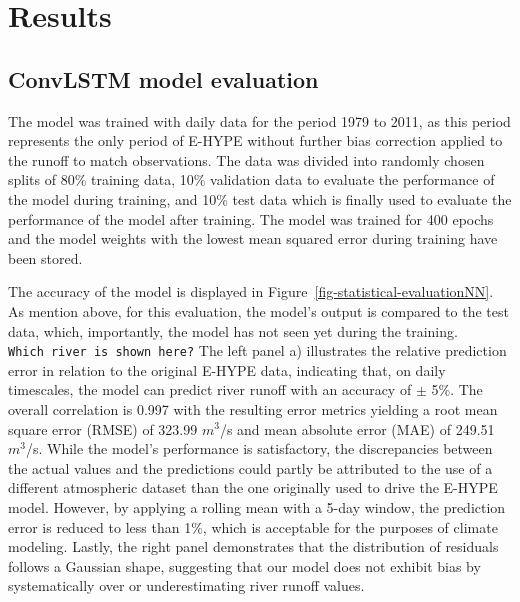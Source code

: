 \documentclass[
]{agujournal2019}
\begin{document}
\section{Results}\label{results}

\subsection{ConvLSTM model evaluation}\label{sec-evaluation}

The model was trained with daily data for the period 1979 to 2011, as
this period represents the only period of E-HYPE without further bias
correction applied to the runoff to match observations. The data was
divided into randomly chosen splits of 80\(\%\) training data, 10\(\%\)
validation data to evaluate the performance of the model during
training, and 10\(\%\) test data which is finally used to evaluate the
performance of the model after training. The model was trained for 400
epochs and the model weights with the lowest mean squared error during
training have been stored.

The accuracy of the model is displayed in
Figure~\ref{fig-statistical-evaluationNN}. As mention above, for this
evaluation, the model's output is compared to the test data, which,
importantly, the model has not seen yet during the training.
\texttt{Which\ river\ is\ shown\ here?} The left panel a) illustrates
the relative prediction error in relation to the original E-HYPE data,
indicating that, on daily timescales, the model can predict river runoff
with an accuracy of \(\pm\) 5\(\%\). The overall correlation is 0.997
with the resulting error metrics yielding a root mean square error
(RMSE) of 323.99 \(m^3\)/s and mean absolute error (MAE) of 249.51
\(m^3\)/s. While the model's performance is satisfactory, the
discrepancies between the actual values and the predictions could partly
be attributed to the use of a different atmospheric dataset than the one
originally used to drive the E-HYPE model. However, by applying a
rolling mean with a 5-day window, the prediction error is reduced to
less than 1\(\%\), which is acceptable for the purposes of climate
modeling. Lastly, the right panel demonstrates that the distribution of
residuals follows a Gaussian shape, suggesting that our model does not
exhibit bias by systematically over or underestimating river runoff
values.
\end{document}
